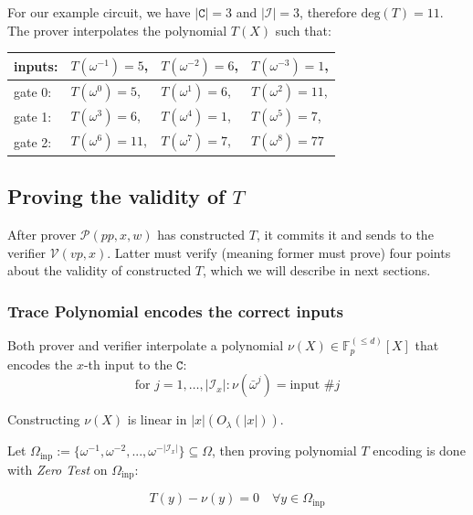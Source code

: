 \documentclass[../lecture-notes.tex]{subfiles}
\begin{document}
\begin{example}
For our example circuit, we have \(|\texttt{C}| = 3\) and \(|\mathcal{I}| = 3\), therefore \(\text{deg}(T) = 11\). The prover interpolates the polynomial \(T(X)\) such that:
\begin{center}
\begin{tabular}{l l l l}
  inputs: & $T(\omega^{-1}) = 5$, & $T(\omega^{-2}) = 6$, & $T(\omega^{-3}) = 1$, \\ \hline
  gate 0: & $T(\omega^{0}) = 5$, & $T(\omega^{1}) = 6$, & $T(\omega^{2}) = 11$, \\
  gate 1: & $T(\omega^{3}) = 6$, & $T(\omega^{4}) = 1$, & $T(\omega^{5}) = 7$, \\
  gate 2: & $T(\omega^{6}) = 11$, & $T(\omega^{7}) = 7$, & $T(\omega^{8}) = 77$ \\ 
\end{tabular}
\end{center}
\end{example}

\subsection{Proving the validity of \texorpdfstring{\(T\)}{T}}

After prover \(\mathcal{P}(pp, x, w)\) has constructed \(T\), it commits it and sends to the verifier \(\mathcal{V}(vp, x)\). Latter must verify (meaning former must prove) four points about the validity of constructed \(T\), which we will describe in next sections.

\subsubsection{Trace Polynomial encodes the correct inputs}
Both prover and verifier interpolate a polynomial \(\nu(X) \in \mathbb{F}_p^{(\leq d)}[X] \) that encodes the \(x\)-th input to the \(\texttt{C}\):
\[\text{for } j = 1, \dots, |\mathcal{I}_x| : \nu(\bar{\omega}^j) = \text{input } \#j\]

\begin{remark}
Constructing \(\nu(X)\) is linear in \(|x| \left( O_\lambda(|x|) \right)\).
\end{remark}

Let \(\Omega_{\text{inp}} := \{ \omega^{-1}, \omega^{-2}, ..., \omega^{-|\mathcal{I}_x|} \} \subseteq \Omega\), then proving polynomial \(T\) encoding is done with \textit{Zero Test} on \(\Omega_{\text{inp}}\):

\[T(y) - \nu(y) = 0 \quad \forall y \in \Omega_{\text{inp}}\]
\end{document}
